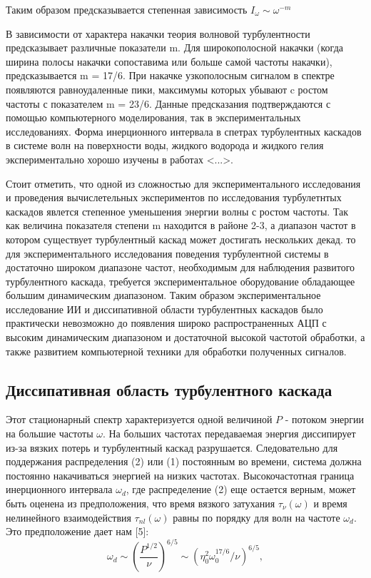 Таким образом предсказывается степенная зависимость $I_\omega \sim \omega^{-m}$

В зависимости от характера накачки теория волновой турбулентности предсказывает различные показатели m. Для широкополосной накачки (когда ширина полосы накачки сопоставима или больше самой частоты накачки), предсказывается m = 17/6. При накачке узкополосным сигналом в спектре появляются равноудаленные пики, максимумы которых убывают c ростом частоты с показателем m = 23/6. Данные предсказания подтверждаются с помощью компьютерного моделирования, так в экспериментальных исследованиях. Форма инерционного интервала в спетрах турбулентных каскадов в системе волн на поверхности воды, жидкого водорода и жидкого гелия экспериментально хорошо изучены в работах <...>. 

Стоит отметить, что одной из сложностью для экспериментального исследования и проведения вычислетельных экспериментов по исследования турбулетнтых каскадов явлется степенное уменьшения энергии волны с ростом частоты. Так как величина показателя степени m находится в районе 2-3, а диапазон частот в котором существует турбулентный каскад может достигать нескольких декад. то для экспериментального исследования поведения турбулентной системы в достаточно широком диапазоне частот, необходимым для наблюдения развитого турбулентного каскада, требуется экспериментальное оборудование обладающее большим динамическим диапазоном. Таким образом экспериментальное исследование ИИ и диссипативной области турбулентных каскадов было практически невозможно до появления широко распространенных АЦП с высоким динамическим диапазоном и достаточной высокой частотой обработки, а также развитием компьютерной техники для обработки полученных сигналов.

\subsection{Диссипативная область турбулентного каскада} \label{subsect_disp}
Этот стационарный спектр характеризуется одной величиной $P$ - потоком энергии на большие частоты $\omega$. На больших частотах передаваемая энергия диссипирует из-за вязких потерь и турбулентный каскад разрушается. Следовательно для поддержания распределения (2) или (1) постоянным во времени, система должна постоянно накачиваться энергией на низких частотах. Высокочастотная граница инерционного интервала $\omega_d$, где распределение (2) еще остается верным, может быть оценена из предположения, что время вязкого затухания $\tau_\nu(\omega)$ и время нелинейного взаимодействия $\tau_{nl}(\omega)$ равны по порядку для волн на частоте $\omega_d$. Это предположение дает нам [5]:
\begin{equation}
\omega_d	 \sim (\frac{P^{1/2}}{\nu})^{6/5} \sim (\eta_0^2\omega_0^{17/6}/\nu)^{6/5},
\end{equation}

